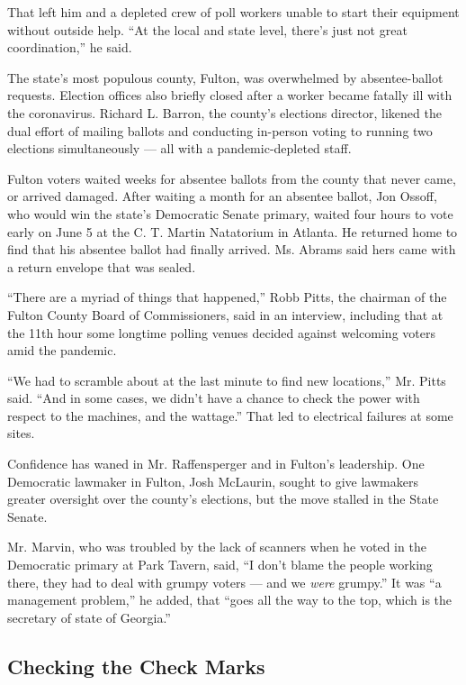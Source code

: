 That left him and a depleted crew of poll workers unable to start their
equipment without outside help. ``At the local and state level, there's
just not great coordination,'' he said.

The state's most populous county, Fulton, was overwhelmed by
absentee-ballot requests. Election offices also briefly closed after a
worker became fatally ill with the coronavirus. Richard L. Barron, the
county's elections director, likened the dual effort of mailing ballots
and conducting in-person voting to running two elections simultaneously
--- all with a pandemic-depleted staff.

Fulton voters waited weeks for absentee ballots from the county that
never came, or arrived damaged. After waiting a month for an absentee
ballot, Jon Ossoff, who would win the state's Democratic Senate primary,
waited four hours to vote early on June 5 at the C. T. Martin Natatorium
in Atlanta. He returned home to find that his absentee ballot had
finally arrived. Ms. Abrams said hers came with a return envelope that
was sealed.

``There are a myriad of things that happened,'' Robb Pitts, the chairman
of the Fulton County Board of Commissioners, said in an interview,
including that at the 11th hour some longtime polling venues decided
against welcoming voters amid the pandemic.

``We had to scramble about at the last minute to find new locations,''
Mr. Pitts said. ``And in some cases, we didn't have a chance to check
the power with respect to the machines, and the wattage.'' That led to
electrical failures at some sites.

Confidence has waned in Mr. Raffensperger and in Fulton's leadership.
One Democratic lawmaker in Fulton, Josh McLaurin, sought to give
lawmakers greater oversight over the county's elections, but the move
stalled in the State Senate.

Mr. Marvin, who was troubled by the lack of scanners when he voted in
the Democratic primary at Park Tavern, said, ``I don't blame the people
working there, they had to deal with grumpy voters --- and we
\emph{were} grumpy.'' It was ``a management problem,'' he added, that
``goes all the way to the top, which is the secretary of state of
Georgia.''

\hypertarget{checking-the-check-marks}{%
\subsection{Checking the Check Marks}\label{checking-the-check-marks}}

